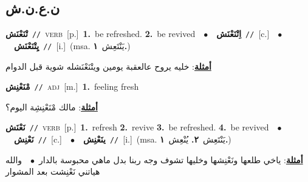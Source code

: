\documentclass[10pt,a4paper,twoside]{article} %
\begin{document}
\begin{multicols}{2}
\vspace{-3mm}
\subsection*{\color{blue}\foreignlanguage{arabic}{ن.ع.ن.ش}\color{blue}{}} 

{\setlength\topsep{0pt}\textbf{\foreignlanguage{arabic}{تْنَعْنَش}}\ {\color{gray}\texttt{//}\color{black}}\ \textsc{verb}\ [p.]\ \textbf{1.}~be refreshed.  \textbf{2.}~be revived\ \ $\bullet$\ \ \setlength\topsep{0pt}\textbf{\foreignlanguage{arabic}{اِتْنَعْنَش}}\ {\color{gray}\texttt{//}\color{black}}\ [c.]\ \ $\bullet$\ \ \setlength\topsep{0pt}\textbf{\foreignlanguage{arabic}{يِتْنَعْنَش}}\ {\color{gray}\texttt{//}\color{black}}\ [i.]\ \color{gray}(msa. \foreignlanguage{arabic}{يَنْتَعِش}~\foreignlanguage{arabic}{\textbf{١.}})\color{black}\  \begin{flushright}\color{gray}\foreignlanguage{arabic}{\textbf{\underline{\foreignlanguage{arabic}{أمثلة}}}: خليه يروح عالعقبة يومين ويتْنَعْنَشله شوية قبل الدوام}\end{flushright}\color{black}} \vspace{2mm}

{\setlength\topsep{0pt}\textbf{\foreignlanguage{arabic}{مْنَعْنِش}}\ {\color{gray}\texttt{//}\color{black}}\ \textsc{adj}\ [m.]\ \textbf{1.}~feeling fresh\  \begin{flushright}\color{gray}\foreignlanguage{arabic}{\textbf{\underline{\foreignlanguage{arabic}{أمثلة}}}: مالك مْنَعْنِشِة اليوم؟}\end{flushright}\color{black}} \vspace{2mm}

{\setlength\topsep{0pt}\textbf{\foreignlanguage{arabic}{نَعْنَش}}\ {\color{gray}\texttt{//}\color{black}}\ \textsc{verb}\ [p.]\ \textbf{1.}~refresh  \textbf{2.}~revive  \textbf{3.}~be refreshed.  \textbf{4.}~be revived\ \ $\bullet$\ \ \setlength\topsep{0pt}\textbf{\foreignlanguage{arabic}{نَعْنِش}}\ {\color{gray}\texttt{//}\color{black}}\ [c.]\ \ $\bullet$\ \ \setlength\topsep{0pt}\textbf{\foreignlanguage{arabic}{ينَعْنِش}}\ {\color{gray}\texttt{//}\color{black}}\ [i.]\ \color{gray}(msa. \foreignlanguage{arabic}{يَنْتَعِش}~\foreignlanguage{arabic}{\textbf{٢.}}  \foreignlanguage{arabic}{يُنْعِش}~\foreignlanguage{arabic}{\textbf{١.}})\color{black}\  \begin{flushright}\color{gray}\foreignlanguage{arabic}{\textbf{\underline{\foreignlanguage{arabic}{أمثلة}}}: ياخي طلعها ونَعْنِشها وخليها تشوف وجه ربنا بدل ماهي محبوسة بالدار\ $\bullet$\ \  والله هياتني نَعْنِشت بعد المشوار}\end{flushright}\color{black}} \vspace{2mm}


\end{multicols}
\end{document}
